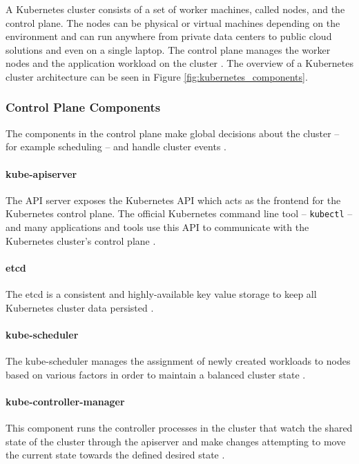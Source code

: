 A Kubernetes cluster consists of a set of worker machines, called nodes, and the control plane. The nodes can be physical or virtual machines depending on the environment and can run anywhere from private data centers to public cloud solutions and even on a single laptop. The control plane manages the worker nodes and the application workload on the cluster \cite{KubernetesArchitecture}. The overview of a Kubernetes cluster architecture can be seen in Figure \ref{fig:kubernetes_components}.

\subsubsection{Control Plane Components} \label{background-kubernetes-control-plane}

The components in the control plane make global decisions about the cluster -- for example scheduling -- and handle cluster events \cite{KubernetesArchitecture}. 

\paragraph{kube-apiserver} The API server exposes the Kubernetes API which acts as the frontend for the Kubernetes control plane. The official Kubernetes command line tool -- \texttt{kubectl} -- and many applications and tools use this API to communicate with the Kubernetes cluster's control plane \cite{KubernetesArchitecture}.

\paragraph{etcd} The etcd is a consistent and highly-available key value storage to keep all Kubernetes cluster data persisted \cite{KubernetesArchitecture}.

\paragraph{kube-scheduler} The kube-scheduler manages the assignment of newly created workloads to nodes based on various factors in order to maintain a balanced cluster state \cite{KubernetesArchitecture}.

\paragraph{kube-controller-manager} This component runs the controller processes in the cluster that watch the shared state of the cluster through the apiserver and make changes attempting to move the current state towards the defined desired state \cite{KubernetesArchitecture}.

